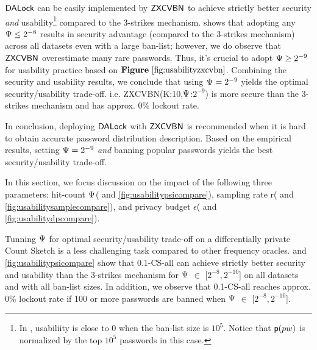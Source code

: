 $\mathsf{DALock}$ can be easily implemented by $\mathsf{ZXCVBN}$ to achieve strictly better security \textit{and} usability\footnote{In , usabiliity is close to 0 when the ban-list size is $10^5$. Notice that $\textsf{p}(pw)$ is normalized by the top $10^5$ passwords in this case.} compared to the 3-strikes mechanism.  shows that adopting any $\Psi \le 2^{-8}$ results in security advantage (compared to the 3-strikes mechanism) across all datasets even with a large ban-list; however, we do observe that $\mathsf{ZXCVBN}$ overestimate many rare passwords. Thus, it's crucial to adopt $\Psi \ge 2^{-9}$ for usability practice based on $\lazyref{Figure}{fig:usabilityzxcvbn}$. Combining the security and usability results, we conclude that using $\Psi = 2^{-9}$ yields the optimal security/usability trade-off. i.e. ZXCVBN(K:10,$\Psi$:$2^{-9}$) is more secure than the 3-strikes mechanism and has approx. 0\% lockout rate.

In conclusion, deploying $\mathsf{DALock}$ with $\mathsf{ZXCVBN}$ is recommended when it is hard to obtain accurate password distribution description. Based on the empirical results, setting $\Psi = 2^{-9}$ \textit{and} banning popular passwords yields the best security/usability trade-off.


 In this section, we focus discussion on the impact of the following three parameters: hit-count $\Psi$( and \ref{fig:usabilitypsicompare}), sampling rate r( and \ref{fig:usabilitysamplecompare}), and privacy budget $\epsilon$( and \ref{fig:usabilitydpcompare}).

Tunning $\Psi$ for optimal security/usability trade-off on a differentially private Count Sketch is a less challenging task compared to other frequency oracles.  and \ref{fig:usabilitypsicompare} show that 0.1-CS-all can achieve strictly better security and usability than the 3-strikes mechanism for $\Psi$ $\in$ [$2^{-8},2^{-10}$] on all datasets and with all ban-list sizes. In addition, we observe that 0.1-CS-all reaches approx. 0\% lockout rate if 100 or more passwords are banned when $\Psi$ $\in$ [$2^{-8},2^{-10}$]. 

